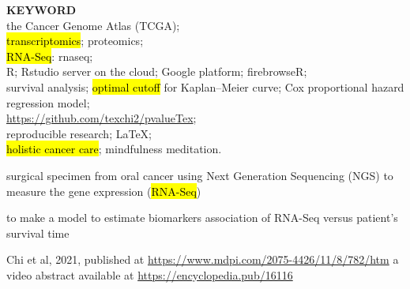 \documentclass[
paper=landscape,
paper=160mm:90mm, %
fontsize=11pt, %
pagesize, %
parskip=half-, %
]{scrartcl} %
\theoremstyle{mythmstyle} %
\begin{document}
\thispagestyle{empty} %

\small\tableofcontents %


\textbf{KEYWORD}\\
the Cancer Genome Atlas (TCGA); \\
\hl{transcriptomics}; proteomics; \\
\hl{RNA-Seq}: \acrlong{rnaseq};\\ %
R; Rstudio server on the cloud; Google platform; firebrowseR;\\
survival analysis; \hl{optimal cutoff} for Kaplan--Meier curve; Cox proportional hazard regression model;\\
\url{https://github.com/texchi2/pvalueTex}; \\
reproducible research; \LaTeX;\\
\hl{holistic cancer care}; mindfulness meditation.

\begin{outline}

\1 surgical specimen from oral cancer %
\2 using Next Generation Sequencing (NGS) to measure the gene expression (\hl{RNA-Seq})

\1 to make a model to estimate biomarkers
\2 association of RNA-Seq versus patient's survival time %

\1 Chi et al, 2021, published at \url{https://www.mdpi.com/2075-4426/11/8/782/htm}
\2 a video abstract available at
\url{https://encyclopedia.pub/16116}

\end{outline}

\clearpage
\end{document}

